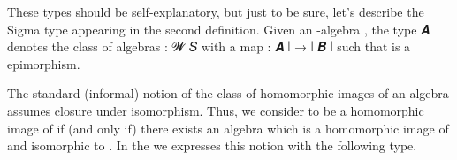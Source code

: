 \begin{code}
\AgdaSpace{}%
\AgdaSymbol{=}\AgdaSpace{}%
\AgdaSpace{}%
\AgdaSpace{}%
\AgdaSpace{}%
\AgdaSymbol{(}\AgdaSpace{}%
\AgdaSpace{}%
\AgdaSymbol{)}\AgdaSpace{}%
\AgdaFunction{,}\AgdaSpace{}%
\AgdaSpace{}%
\AgdaSpace{}%
\AgdaSpace{}%
\AgdaSymbol{(}\AgdaSpace{}%
\AgdaSpace{}%
\AgdaSpace{}%
\AgdaSpace{}%
\AgdaSpace{}%
\AgdaSpace{}%
\AgdaSymbol{)}\AgdaSpace{}%
\AgdaFunction{,}\AgdaSpace{}%
\AgdaSpace{}%
\AgdaSpace{}%
\AgdaSpace{}%
\AgdaSpace{}%
\AgdaSpace{}%
\AgdaSpace{}%
\<%
\end{code}
\ccpad
These types should be self-explanatory, but just to be sure, let's describe the Sigma type appearing in the second definition. Given an -algebra , the type  \ab 𝑨 denotes the class of algebras  \as :  \ab 𝓦 \ab 𝑆 with a map  \as :  \ab 𝑨 \af ∣ \as → \af ∣ \ab 𝑩 \af ∣ such that  is a epimorphism.

The standard (informal) notion of the class of homomorphic images of an algebra assumes closure under isomorphism. Thus, we consider  to be a homomorphic image of  if (and only if) there exists an algebra  which is a homomorphic image of  and isomorphic to .  In the \ualib we expresses this notion with the following type.
\ccpad
\begin{code}%
\>[1]\AgdaSpace{}%
\AgdaSymbol{:}\AgdaSpace{}%
\AgdaSymbol{(}\AgdaSpace{}%
\AgdaSymbol{:}\AgdaSpace{}%
\AgdaSpace{}%
\AgdaSpace{}%
\AgdaSymbol{)(}\AgdaSpace{}%
\AgdaSymbol{:}\AgdaSpace{}%
\AgdaSpace{}%
\AgdaSpace{}%
\AgdaSymbol{)}\AgdaSpace{}%
\AgdaSpace{}%
\AgdaSpace{}%
\AgdaSpace{}%
\AgdaSpace{}%
\AgdaSpace{}%
\<%
\\
%
\>[1]\AgdaSpace{}%
\AgdaSpace{}%
\AgdaSpace{}%
\AgdaSymbol{=}\AgdaSpace{}%
\AgdaSpace{}%
\AgdaSpace{}%
\AgdaSpace{}%
\AgdaSymbol{(}\AgdaSpace{}%
\AgdaSymbol{)}\AgdaSpace{}%
\AgdaFunction{,}\AgdaSpace{}%
\AgdaSpace{}%
\AgdaSpace{}%
\AgdaSpace{}%
\AgdaSpace{}%
\<%
\end{code}
\ccpad

